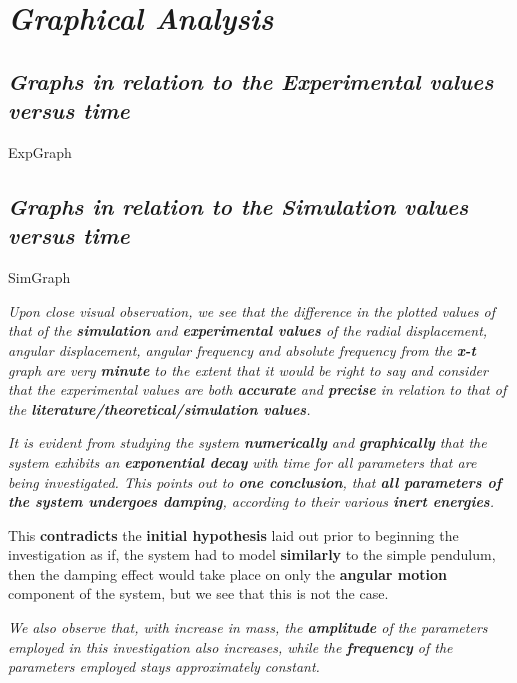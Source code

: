 \section{\textit{Graphical Analysis}}
            
    \subsection{\textit{Graphs in relation to the Experimental values versus time}}
            
        {ExpGraph}
            
    \subsection{\textit{Graphs in relation to the Simulation values versus time}}
            
        {SimGraph}
            
            
    \textit{Upon close visual observation, we see that the difference in the plotted values of that of the \textbf{simulation} and \textbf{experimental values} of the radial displacement, angular displacement, angular frequency and absolute frequency from the \textbf{x-t} graph are very \textbf{minute} to the extent that it would be right to say and consider that the experimental values are both \textbf{accurate} and \textbf{precise} in relation to that of the \textbf{literature/theoretical/simulation values}.}
        
	\textit{It is evident from studying the system \textbf{numerically} and \textbf{graphically} that the system exhibits an \textbf{exponential decay} with time for all parameters that are being investigated. This points out to \textbf{one conclusion}, that \textbf{all parameters of the system undergoes damping}, according to their various \textbf{inert energies}.}
	 
	{This \textbf{contradicts} the \textbf{initial hypothesis} laid out prior to beginning the investigation as if, the system had to model \textbf{similarly} to the simple pendulum, then the damping effect would take place on only the \textbf{angular motion} component of the system, but we see that this is not the case.}        
        
    \textit{We also observe that, with increase in mass, the \textbf{amplitude} of the parameters employed in this investigation also increases, while the \textbf{frequency} of the parameters employed stays approximately constant.}
        
    
    

